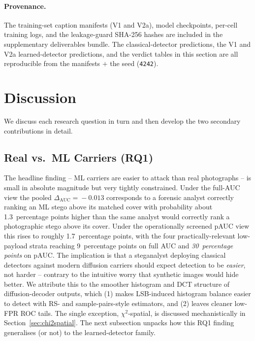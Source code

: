 \documentclass[10pt,twocolumn,a4paper]{article}
\begin{document}
\paragraph{Provenance.} The training-set caption manifests (V1 and V2a), model checkpoints, per-cell training logs, and the leakage-guard SHA-256 hashes are included in the supplementary deliverables bundle. The classical-detector predictions, the V1 and V2a learned-detector predictions, and the verdict tables in this section are all reproducible from the manifests $+$ the seed (\texttt{4242}).

\section{Discussion}
\label{sec:discussion}

We discuss each research question in turn and then develop the two secondary contributions in detail.

\subsection{Real vs.\ ML Carriers (RQ1)}

The headline finding -- ML carriers are easier to attack than real photographs -- is small in absolute magnitude but very tightly constrained. Under the full-AUC view the pooled $\Delta_\text{AUC}\!=\!-0.013$ corresponds to a forensic analyst correctly ranking an ML stego above its matched cover with probability about 1.3~percentage points higher than the same analyst would correctly rank a photographic stego above its cover. Under the operationally screened pAUC view this rises to roughly 1.7~percentage points, with the four practically-relevant low-payload strata reaching 9~percentage points on full AUC and \emph{30~percentage points} on pAUC. The implication is that a steganalyst deploying classical detectors against modern diffusion carriers should expect detection to be \emph{easier}, not harder -- contrary to the intuitive worry that synthetic images would hide better. We attribute this to the smoother histogram and DCT structure of diffusion-decoder outputs, which (1) makes LSB-induced histogram balance easier to detect with RS- and sample-pairs-style estimators, and (2) leaves cleaner low-FPR ROC tails. The single exception, $\chi^2$-spatial, is discussed mechanistically in Section~\ref{sec:chi2spatial}. The next subsection unpacks how this RQ1 finding generalises (or not) to the learned-detector family.
\end{document}
